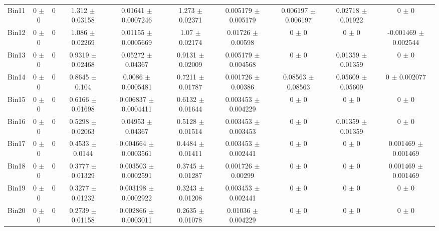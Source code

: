 \begin{tabular}{@{\extracolsep{4pt}}lccccccccc@{}}
     Bin11 & 0 $\pm$ 0 & 0 & 1.312 $\pm$ 0.03158 & 0.01641 $\pm$ 0.0007246 & 1.273 $\pm$ 0.02371 & 0.005179 $\pm$ 0.005179 & 0.006197 $\pm$ 0.006197 & 0.02718 $\pm$ 0.01922 & 0 $\pm$ 0 \\ 
     Bin12 & 0 $\pm$ 0 & 0 & 1.086 $\pm$ 0.02269 & 0.01155 $\pm$ 0.0005669 & 1.07 $\pm$ 0.02174 & 0.01726 $\pm$ 0.00598 & 0 $\pm$ 0 & 0 $\pm$ 0 & -0.001469 $\pm$ 0.002544 \\ 
     Bin13 & 0 $\pm$ 0 & 0 & 0.9319 $\pm$ 0.02468 & 0.05272 $\pm$ 0.04367 & 0.9131 $\pm$ 0.02009 & 0.005179 $\pm$ 0.004568 & 0 $\pm$ 0 & 0.01359 $\pm$ 0.01359 & 0 $\pm$ 0 \\ 
     Bin14 & 0 $\pm$ 0 & 0 & 0.8645 $\pm$ 0.104 & 0.0086 $\pm$ 0.0005481 & 0.7211 $\pm$ 0.01787 & 0.001726 $\pm$ 0.00386 & 0.08563 $\pm$ 0.08563 & 0.05609 $\pm$ 0.05609 & 0 $\pm$ 0.002077 \\ 
     Bin15 & 0 $\pm$ 0 & 0 & 0.6166 $\pm$ 0.01698 & 0.006837 $\pm$ 0.0004411 & 0.6132 $\pm$ 0.01644 & 0.003453 $\pm$ 0.004229 & 0 $\pm$ 0 & 0 $\pm$ 0 & 0 $\pm$ 0 \\ 
     Bin16 & 0 $\pm$ 0 & 0 & 0.5298 $\pm$ 0.02063 & 0.04953 $\pm$ 0.04367 & 0.5128 $\pm$ 0.01514 & 0.003453 $\pm$ 0.003453 & 0 $\pm$ 0 & 0.01359 $\pm$ 0.01359 & 0 $\pm$ 0 \\ 
     Bin17 & 0 $\pm$ 0 & 0 & 0.4533 $\pm$ 0.0144 & 0.004664 $\pm$ 0.0003561 & 0.4484 $\pm$ 0.01411 & 0.003453 $\pm$ 0.002441 & 0 $\pm$ 0 & 0 $\pm$ 0 & 0.001469 $\pm$ 0.001469 \\ 
     Bin18 & 0 $\pm$ 0 & 0 & 0.3777 $\pm$ 0.01329 & 0.003503 $\pm$ 0.0002591 & 0.3745 $\pm$ 0.01287 & 0.001726 $\pm$ 0.00299 & 0 $\pm$ 0 & 0 $\pm$ 0 & 0.001469 $\pm$ 0.001469 \\ 
     Bin19 & 0 $\pm$ 0 & 0 & 0.3277 $\pm$ 0.01232 & 0.003198 $\pm$ 0.0002922 & 0.3243 $\pm$ 0.01208 & 0.003453 $\pm$ 0.002441 & 0 $\pm$ 0 & 0 $\pm$ 0 & 0 $\pm$ 0 \\ 
     Bin20 & 0 $\pm$ 0 & 0 & 0.2739 $\pm$ 0.01158 & 0.002866 $\pm$ 0.0003011 & 0.2635 $\pm$ 0.01078 & 0.01036 $\pm$ 0.004229 & 0 $\pm$ 0 & 0 $\pm$ 0 & 0 $\pm$ 0 \\ 
\hline\hline
  \end{tabular}
